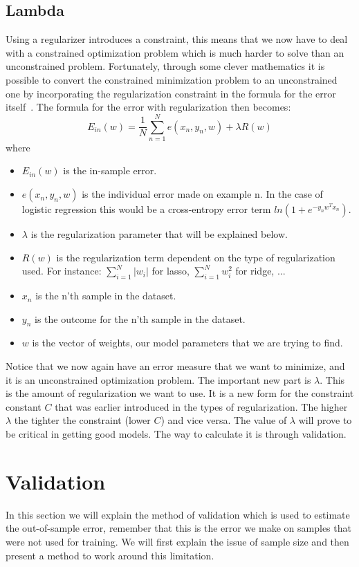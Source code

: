 \subsection{Lambda}
\label{subsec:glm-lambda}
Using a regularizer introduces a constraint, this means that we now have to deal with a constrained optimization problem which is much harder to solve than an unconstrained problem. Fortunately, through some clever mathematics it is possible to convert the constrained minimization problem to an unconstrained one by incorporating the regularization constraint in the formula for the error itself~\cite{caltechmachinelearning}. The formula for the error with regularization then becomes:
$$
E_{in}(w) = \frac{1}{N}\sum_{n=1}^{N}e(x_{n},y_{n},w)+\lambda R(w)
$$
where
\begin{itemize}
	\item $E_{in}(w)$ is the in-sample error.
	\item $e(x_{n},y_{n},w)$ is the individual error made on example n. In the case of logistic regression this would be a cross-entropy error term $ln(1+e^{-y_{n}w^{T}x_{n}})$.
	\item $\lambda$ is the regularization parameter that will be explained below.
	\item $R(w)$ is the regularization term dependent on the type of regularization used. For instance: $\sum_{i=1}^{N}\lvert w_{i}\rvert$ for lasso, $\sum_{i=1}^{N}w_{i}^{2}$ for ridge, ...
	\item $x_{n}$ is the n'th sample in the dataset.
	\item $y_{n}$ is the outcome for the n'th sample in the dataset.
	\item $w$ is the vector of weights, our model parameters that we are trying to find.
\end{itemize}
Notice that we now again have an error measure that we want to minimize, and it is an unconstrained optimization problem. The important new part is $\lambda$. This is the amount of regularization we want to use. It is a new form for the constraint constant $C$ that was earlier introduced in the types of regularization. The higher $\lambda$ the tighter the constraint (lower $C$) and vice versa. The value of $\lambda$ will prove to be critical in getting good models. The way to calculate it is through validation.
\section{Validation}
\label{sec:glm-validation}
In this section we will explain the method of validation which is used to estimate the out-of-sample error, remember that this is the error we make on samples that were not used for training. We will first explain the issue of sample size and then present a method to work around this limitation.
